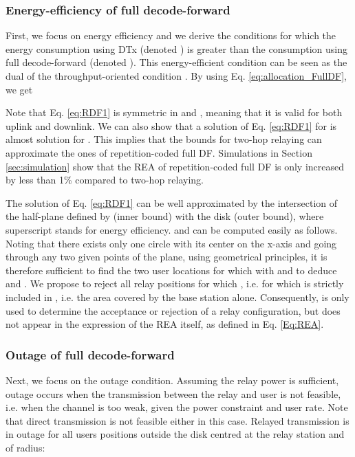 \documentclass[journal]{IEEEtran}
\theoremstyle{definition}
\begin{document}
\subsubsection{Energy-efficiency of full decode-forward}
\label{sec:EE_Full_DF}

First, we focus on energy efficiency and we derive the conditions for which the energy consumption using DTx (denoted ) is greater than the consumption using full decode-forward (denoted ). This energy-efficient condition can be seen as the dual of the throughput-oriented condition .  By using Eq. \eqref{eq:allocation_FullDF}, we get


Note that Eq. \eqref{eq:RDF1} is symmetric in  and , meaning that it is valid for both uplink and downlink.
We can also show that a solution of Eq. \eqref{eq:RDF1} for  is almost solution for .
This implies that the bounds for two-hop relaying can approximate the ones of repetition-coded full DF. Simulations in Section \ref{sec:simulation} show that the REA of repetition-coded full DF is only increased by less than 1\% compared to two-hop relaying.


The solution of Eq. \eqref{eq:RDF1} can be well approximated by the intersection of the half-plane defined by  (inner bound) with the disk  (outer bound), where superscript  stands for energy efficiency.
  and  can be computed easily as follows. Noting that there exists only one circle with its center on the x-axis and going through any two given points of the plane, using geometrical principles, it is therefore sufficient to find the two user locations for which  with  and  to deduce  and .
We propose to reject all relay positions for which , i.e. for which  is strictly included in , i.e. the area covered by the base station alone.
Consequently,  is only used to determine the acceptance or rejection of a relay configuration, but does not appear in the expression of the REA itself, as defined in Eq. \eqref{Eq:REA}.


\subsubsection{Outage of full decode-forward}

Next, we focus on the outage condition. Assuming the relay power is sufficient, outage occurs when the transmission between the relay and user is not feasible, i.e. when the channel  is too weak, given the power constraint and user rate. Note that direct transmission is not feasible either in this case. Relayed transmission is in outage for all users positions outside the disk centred at the relay station and of radius:
\end{document}
